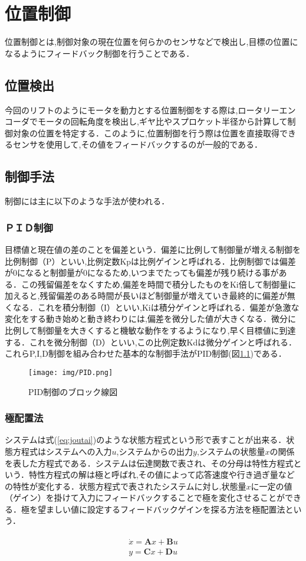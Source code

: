
\chapter{位置制御}位置制御とは,制御対象の現在位置を何らかのセンサなどで検出し,目標の位置になるようにフィードバック制御を行うことである．

\section{位置検出}今回のリフトのようにモータを動力とする位置制御をする際は,ロータリーエンコーダでモータの回転角度を検出し,ギヤ比やスプロケット半径から計算して制御対象の位置を特定する．このように,位置制御を行う際は位置を直接取得できるセンサを使用して,その値をフィードバックするのが一般的である．

\section{制御手法}
制御には主に以下のような手法が使われる．

\subsection{ＰＩＤ制御}目標値と現在値の差のことを偏差という．偏差に比例して制御量が増える制御を比例制御（P）といい,比例定数Kpは比例ゲインと呼ばれる．比例制御では偏差が0になると制御量が0になるため,いつまでたっても偏差が残り続ける事がある．この残留偏差をなくすため,偏差を時間で積分したものをKi倍して制御量に加えると,残留偏差のある時間が長いほど制御量が増えていき最終的に偏差が無くなる．これを積分制御（I）といい,Kiは積分ゲインと呼ばれる．偏差が急激な変化をする動き始めと動き終わりには,偏差を微分した値が大きくなる．微分に比例して制御量を大きくすると機敏な動作をするようになり,早く目標値に到達する．これを微分制御（D）といい,この比例定数Kdは微分ゲインと呼ばれる．これらP,I,D制御を組み合わせた基本的な制御手法がPID制御(図\ref{fig:PID})である．

\begin{figure}[htbp]
  \begin{center}
    \texttt{[image: img/PID.png]}
    \end{center}
  \caption{PID制御のブロック線図}
 \label{fig:PID}
\end{figure}

\subsection{極配置法}システムは式(\ref{eq:joutai})のような状態方程式という形で表すことが出来る．状態方程式はシステムへの入力$u$,システムからの出力$y$,システムの状態量$x$の関係を表した方程式である．システムは伝達関数で表され、その分母は特性方程式という．特性方程式の解は極と呼ばれ,その値によって応答速度や行き過ぎ量などの特性が変化する．状態方程式で表されたシステムに対し,状態量$x$に一定の値（ゲイン）を掛けて入力にフィードバックすることで極を変化させることができる．極を望ましい値に設定するフィードバックゲインを探る方法を極配置法という．

\begin{eqnarray}
\begin{array}{l}
\dot{x}=\bm{A}x+\bm{B}u\\
y=\bm{C}x+\bm{D}u
\end{array}
\label{eq:joutai}
\end{eqnarray}
